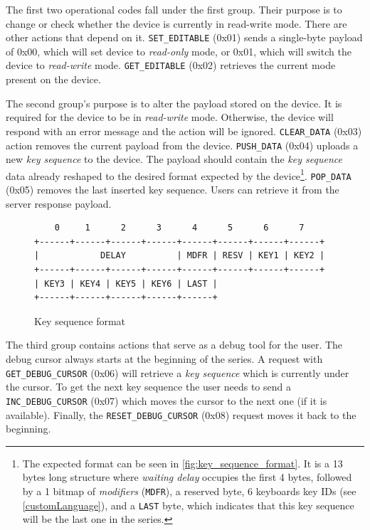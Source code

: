 The first two operational codes fall under the first group. Their purpose is to change or check whether the device is currently in read-write mode. There are other actions that depend on it. \verb|SET_EDITABLE| (0x01) sends a single-byte payload of 0x00, which will set device to \emph{read-only} mode, or 0x01, which will switch the device to \emph{read-write} mode. \verb|GET_EDITABLE| (0x02) retrieves the current mode present on the device.

The second group's purpose is to alter the payload stored on the device. It is required for the device to be in \emph{read-write} mode. Otherwise, the device will respond with an error message and the action will be ignored. \verb|CLEAR_DATA| (0x03) action removes the current payload from the device. \verb|PUSH_DATA| (0x04) uploads a new \emph{key sequence} to the device. The payload should contain the \emph{key sequence} data already reshaped to the desired format expected by the device\footnote{The expected format can be seen in \autoref{fig:key_sequence_format}. It is a 13 bytes long structure where \emph{waiting delay} occupies the first 4 bytes, followed by a 1 bitmap of \emph{modifiers} (\texttt{MDFR}), a reserved byte, 6 keyboards key IDs (see \autoref{customLanguage}), and a \texttt{LAST} byte, which indicates that this key sequence will be the last one in the series.}. \verb|POP_DATA| (0x05) removes the last inserted key sequence. Users can retrieve it from the server response payload.

\begin{figure}[ht]
\centering
\begin{varwidth}{\linewidth}
\begin{verbatim}
    0     1      2      3      4      5      6      7
+------+------+------+------+------+------+------+------+
|            DELAY          | MDFR | RESV | KEY1 | KEY2 |
+------+------+------+------+------+------+------+------+
| KEY3 | KEY4 | KEY5 | KEY6 | LAST |
+------+------+------+------+------+
\end{verbatim}
\end{varwidth}
\caption{Key sequence format}
\label{fig:key_sequence_format}
\end{figure}

The third group contains actions that serve as a debug tool for the user. The debug cursor always starts at the beginning of the series. A request with \verb|GET_DEBUG_CURSOR| (0x06) will retrieve a \emph{key sequence} which is currently under the cursor. To get the next key sequence the user needs to send a \verb|INC_DEBUG_CURSOR| (0x07) which moves the cursor to the next one (if it is available). Finally, the \verb|RESET_DEBUG_CURSOR| (0x08) request moves it back to the beginning.

